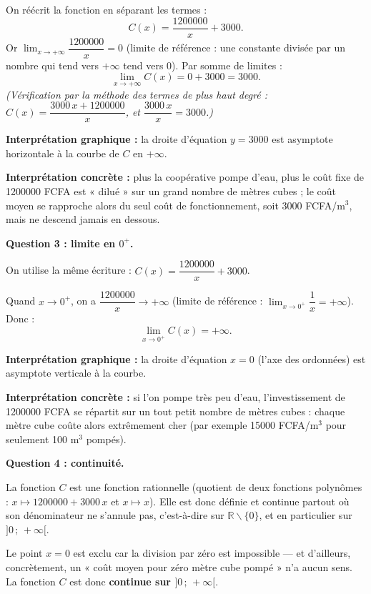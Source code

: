 \documentclass[11pt]{article}
\newcommand{\cle}[1]{{\popxbold\color{popdark}#1}}
\def\setminus{\mathbin{\backslash}}\let\smallsetminus\setminus
\begin{document}
\begin{exoresolu}
On réécrit la fonction en séparant les termes :
\[ C(x) = \dfrac{\num{1200000}}{x} + \num{3000}. \]
Or $\displaystyle\lim_{x \to +\infty} \dfrac{\num{1200000}}{x} = 0$ (limite de référence : une constante divisée par un nombre qui tend vers $+\infty$ tend vers $0$). Par somme de limites :
\[ \lim_{x \to +\infty} C(x) = 0 + \num{3000} = \num{3000}. \]
\textit{(Vérification par la méthode des termes de plus haut degré : $C(x) = \dfrac{\num{3000}\,x + \num{1200000}}{x}$, et $\dfrac{\num{3000}\,x}{x} = \num{3000}$.)}

\textbf{Interprétation graphique :} la droite d'équation $y = \num{3000}$ est \cle{asymptote horizontale} à la courbe de $C$ en $+\infty$.

\textbf{Interprétation concrète :} plus la coopérative pompe d'eau, plus le coût fixe de \num{1200000} FCFA est « dilué » sur un grand nombre de mètres cubes ; le coût moyen se rapproche alors du seul coût de fonctionnement, soit \num{3000} FCFA/m$^3$, mais ne descend jamais en dessous.

\textbf{Question 3 : limite en $0^+$.}

On utilise la même écriture : $C(x) = \dfrac{\num{1200000}}{x} + \num{3000}$.

Quand $x \to 0^+$, on a $\dfrac{\num{1200000}}{x} \to +\infty$ (limite de référence : $\displaystyle\lim_{x \to 0^+} \dfrac{1}{x} = +\infty$). Donc :
\[ \lim_{x \to 0^+} C(x) = +\infty. \]

\textbf{Interprétation graphique :} la droite d'équation $x = 0$ (l'axe des ordonnées) est \cle{asymptote verticale} à la courbe.

\textbf{Interprétation concrète :} si l'on pompe très peu d'eau, l'investissement de \num{1200000} FCFA se répartit sur un tout petit nombre de mètres cubes : chaque mètre cube coûte alors extrêmement cher (par exemple \num{15000} FCFA/m$^3$ pour seulement 100 m$^3$ pompés).

\textbf{Question 4 : continuité.}

La fonction $C$ est une \cle{fonction rationnelle} (quotient de deux fonctions polynômes : $x \mapsto \num{1200000} + \num{3000}\,x$ et $x \mapsto x$). Elle est donc définie et continue partout où son dénominateur ne s'annule pas, c'est-à-dire sur $\mathbb{R} \setminus \{0\}$, et en particulier sur $]0\,;\,+\infty[$.

Le point $x = 0$ est exclu car la division par zéro est impossible — et d'ailleurs, concrètement, un « coût moyen pour zéro mètre cube pompé » n'a aucun sens. La fonction $C$ est donc \textbf{continue sur $]0\,;\,+\infty[$}.


\end{exoresolu}
\end{document}
